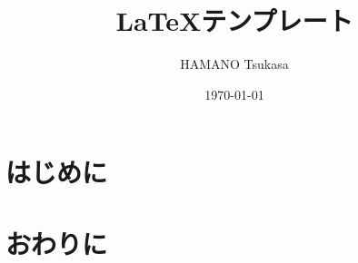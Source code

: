 \documentclass[a4paper,onecolumn,12pt]{jsarticle}
\title{\LaTeX テンプレート}
\author{HAMANO Tsukasa}
\date{\today}
\begin{document}
\maketitle
\vspace{1em}
\tableofcontents
\clearpage

\section{はじめに}
\lipsum[1]

\section{おわりに}
\lipsum[2]
\end{document}
